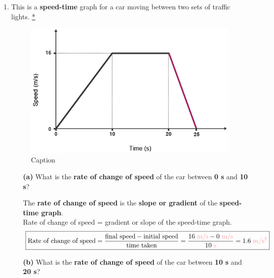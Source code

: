 \documentclass[A4,12pt]{article}
\begin{document}
\begin{enumerate}[label=\bfseries (\arabic*)]
\item This is a \textbf{speed-time} graph for a car moving between two sets of traffic lights. \cite{bbc, Triguero} \href{https://www.bbc.co.uk/bitesize/guides/znpp92p/revision/6}{*}
%
\begin{figure}[H]
    \centering
    \includegraphics{bbc_rateofchangeSpeed.png}
    \caption{Caption}
    \label{fig:my_label}
\end{figure}
%
\begin{itemize}
    \item[\bf (a)] What is the \textbf{rate of change of speed} of the car between \textbf{0 s} and \textbf{10 s}? %
    \begin{example}
    The \textbf{rate of change of speed} is the \textbf{slope or gradient} of the \textbf{speed-time graph}.\\
    
    Rate of change of speed = gradient or slope of the speed-time graph.
    \begin{equation*}
        \boxed{\text{Rate of change of speed}=\frac{\text{final speed}-\text{initial speed}}{\text{time taken}}=\frac{\vsis{16}-\vsis{0}}{\tsis{10}}=\asis{1.6}}
    \end{equation*}
    \end{example}
    \item[\bf (b)] What is the \textbf{rate of change of speed} of the car between \textbf{10 s} and \textbf{20 s}?
    
    

\end{itemize}
\end{enumerate}
\end{document}
